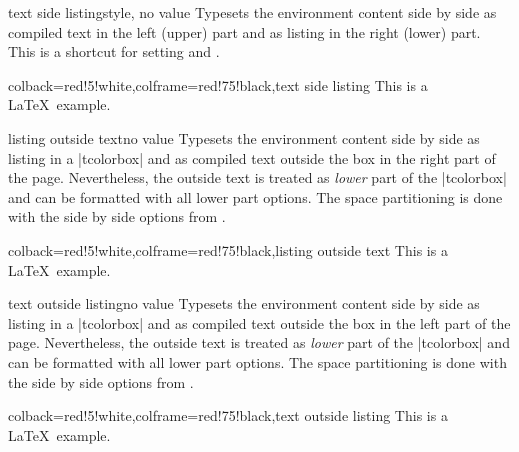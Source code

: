 \begin{docTcbKey}{text side listing}{}{style, no value}
Typesets the environment content side by side as compiled text in the left (upper)
part and as listing in the right (lower) part.
This is a shortcut for setting  and .
\begin{dispExample}
\begin{tcblisting}{colback=red!5!white,colframe=red!75!black,text side listing}
This is a \LaTeX\ example.
\end{tcblisting}
\end{dispExample}
\end{docTcbKey}


\begin{docTcbKey}{listing outside text}{}{no value}
Typesets the environment content side by side as listing in a |tcolorbox|
and as compiled text outside the box in the right part of the page.
Nevertheless, the outside text is treated as \emph{lower} part of the
|tcolorbox| and can be formatted with all lower part options.
The space partitioning is done with the side by side options from
.
\begin{dispExample}
\begin{tcblisting}{colback=red!5!white,colframe=red!75!black,listing outside text}
This is a \LaTeX\ example.
\end{tcblisting}
\end{dispExample}
\end{docTcbKey}

\clearpage

\begin{docTcbKey}{text outside listing}{}{no value}
Typesets the environment content side by side as listing in a |tcolorbox|
and as compiled text outside the box in the left part of the page.
Nevertheless, the outside text is treated as \emph{lower} part of the
|tcolorbox| and can be formatted with all lower part options.
The space partitioning is done with the side by side options from
.
\begin{dispExample}
\begin{tcblisting}{colback=red!5!white,colframe=red!75!black,text outside listing}
This is a \LaTeX\ example.
\end{tcblisting}
\end{dispExample}
\end{docTcbKey}



